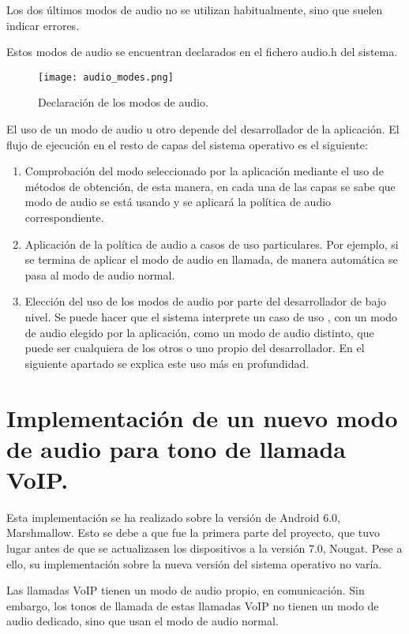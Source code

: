 Los dos últimos modos de audio no se utilizan habitualmente, sino que suelen indicar errores. 

Estos modos de audio se encuentran declarados en el fichero audio.h del sistema.

\begin{figure}[H]
	\centering
	\texttt{[image: audio\_modes.png]}
	\caption{Declaración de los modos de audio.}
	\label{fig:audio_modes}
\end{figure}

El uso de un modo de audio u otro depende del desarrollador de la aplicación. El flujo de ejecución en el resto de capas del sistema operativo es el siguiente:

\begin{enumerate}
	\item Comprobación del modo seleccionado por la aplicación mediante el uso de métodos de obtención, de esta manera, en cada una de las capas se sabe que modo de audio se está usando y se aplicará la política de audio correspondiente.
	\item Aplicación de la política de audio a casos de uso particulares. Por ejemplo, si se termina de aplicar el modo de audio en llamada, de manera automática se pasa al modo de audio normal.
	\item Elección del uso de los modos de audio por parte del desarrollador de bajo nivel. Se puede hacer que el sistema interprete un caso de uso , con un modo de audio elegido por la aplicación, como un modo de audio distinto, que puede ser cualquiera de los otros o uno propio del desarrollador. En el siguiente apartado se explica este uso más en profundidad.
\end{enumerate}


\section{Implementación de un nuevo modo de audio para tono de llamada VoIP.} 
Esta implementación se ha realizado sobre la versión de Android 6.0, Marshmallow. Esto se debe a que fue la primera parte del proyecto, que tuvo lugar antes de que se actualizasen los dispositivos a la versión 7.0, Nougat. Pese a ello, su implementación sobre la nueva versión del sistema operativo no varía.

Las llamadas \gls{VoIP} tienen un modo de audio propio, en comunicación. Sin embargo, los tonos de llamada de estas llamadas \gls{VoIP} no tienen un modo de audio dedicado, sino que usan el modo de audio normal.

